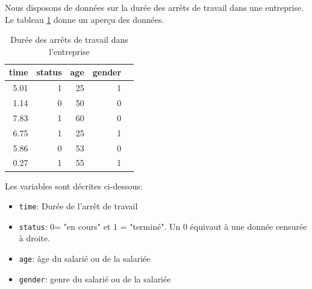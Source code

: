 \documentclass[11pt, addpoints, answers]{exam}
\begin{document}
\begin{questions}
\begin{parts}
\end{parts}
\newpage
\question Nous disposons de données sur la durée des arrêts de travail dans une entreprise. Le tableau \ref{tab:data_incap} donne un aperçu des données.
\begin{table}[!ht]
\centering
\begin{tabular}{rrrrl}
  \hline
 time & status & age & gender \\ 
  \hline
5.01 &   1 &  25 & 1 \\ 
 1.14 &   0 &  50 & 0 \\ 
 7.83 &   1 &  60 & 0 \\ 
  6.75 &   1 &  25 & 1 \\ 
   5.86 &   0 &  53 & 0 \\ 
   0.27 &   1 &  55 & 1 \\ 
   \hline
\end{tabular}
\label{tab:data_incap}
\caption{Durée des arrêts de travail dans l'entreprise}
\end{table}

Les variables sont décrites ci-dessous:
\begin{itemize}
  \item \texttt{time}: Durée de l'arrêt de travail
  \item \texttt{status}: $0$= "en cours" et $1$ = "terminé". Un $0$ équivaut à une donnée censurée à droite.
  \item \texttt{age}: âge du salarié ou de la salariée
  \item \texttt{gender}: genre du salarié ou de la salariée
\end{itemize}
\begin{parts}

\end{parts}
\end{questions}
\end{document}
